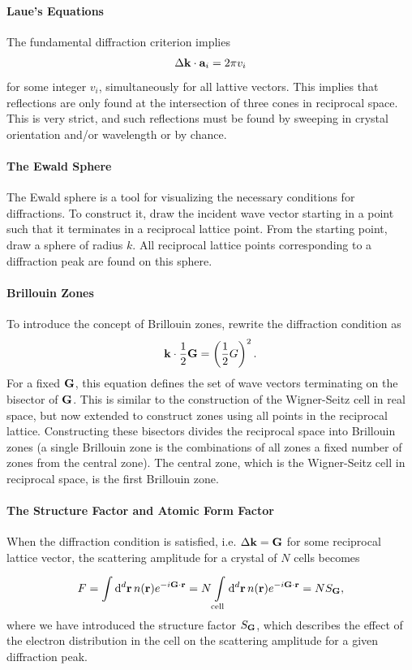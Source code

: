 \paragraph{Laue's Equations}
The fundamental diffraction criterion implies
\begin{align*}
	\Delta\vb{k}\cdot\vb{a}_{i} = 2\pi v_{i}
\end{align*}
for some integer $v_{i}$, simultaneously for all lattive vectors. This implies that reflections are only found at the intersection of three cones in reciprocal space. This is very strict, and such reflections must be found by sweeping in crystal orientation and/or wavelength or by chance.

\paragraph{The Ewald Sphere}
The Ewald sphere is a tool for visualizing the necessary conditions for diffractions. To construct it, draw the incident wave vector starting in a point such that it terminates in a reciprocal lattice point. From the starting point, draw a sphere of radius $k$. All reciprocal lattice points corresponding to a diffraction peak are found on this sphere.

\paragraph{Brillouin Zones}
To introduce the concept of Brillouin zones, rewrite the diffraction condition as
\begin{align*}
	\vb{k}\cdot\frac{1}{2}\vb{G} = \left(\frac{1}{2}G\right)^{2}.
\end{align*}
For a fixed $\vb{G}$, this equation defines the set of wave vectors terminating on the bisector of $\vb{G}$. This is similar to the construction of the Wigner-Seitz cell in real space, but now extended to construct zones using all points in the reciprocal lattice. Constructing these bisectors divides the reciprocal space into Brillouin zones (a single Brillouin zone is the combinations of all zones a fixed number of zones from the central zone). The central zone, which is the Wigner-Seitz cell in reciprocal space, is the first Brillouin zone.

\paragraph{The Structure Factor and Atomic Form Factor}
When the diffraction condition is satisfied, i.e. $\Delta\vb{k} = \vb{G}$ for some reciprocal lattice vector, the scattering amplitude for a crystal of $N$ cells becomes
\begin{align*}
	F = \integ[d]{}{}{\vb{r}}{n(\vb{r})e^{-i\vb{G}\cdot\vb{r}}} = N\integ[d]{\text{cell}}{}{\vb{r}}{n(\vb{r})e^{-i\vb{G}\cdot\vb{r}}} = NS_{\vb{G}},
\end{align*}
where we have introduced the structure factor $S_{\vb{G}}$, which describes the effect of the electron distribution in the cell on the scattering amplitude for a given diffraction peak.

